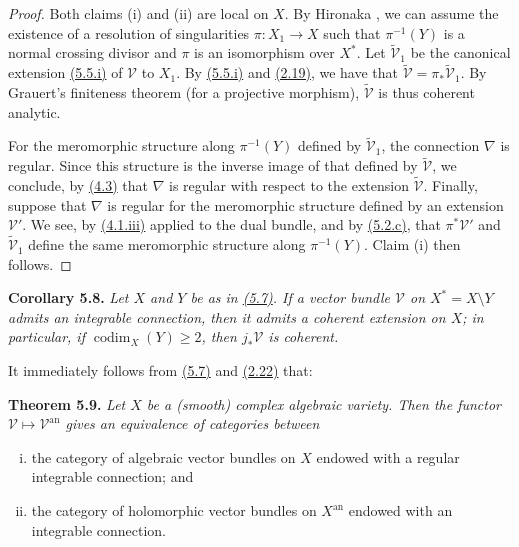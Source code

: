 \documentclass{report}
\newenvironment{itenv}[1]
  {\phantomsection\par\medskip\noindent\textbf{#1.}\itshape}
  {\par\medskip}
\renewcommand{\cal}[1]{{\mathcal{#1}}}
\newcommand{\an}{\mathrm{an}}
\renewcommand{\geq}{\geqslant}
\DeclareMathOperator{\codim}{codim}
\newcommand{\oldpage}[1]{\marginpar{\footnotesize$\Big\vert$ \textit{p.~#1}}}
\begin{document}
\begin{proof}
  Both claims (i) and (ii) are local on $X$.
  By Hironaka \cite{12}, we can assume the existence of a resolution of singularities $\pi\colon X_1\to X$ such that $\pi^{-1}(Y)$ is a normal crossing divisor and $\pi$ is an isomorphism over $X^*$.
  Let $\widetilde{\cal{V}}_1$ be the canonical extension \hyperref[II.5.5]{(5.5.i)} of $\cal{V}$ to $X_1$.
\oldpage{97}
  By \hyperref[II.5.5]{(5.5.i)} and \hyperref[II.2.19]{(2.19)}, we have that $\widetilde{\cal{V}}=\pi_*\widetilde{\cal{V}}_1$.
  By Grauert's finiteness theorem (for a projective morphism), $\widetilde{\cal{V}}$ is thus coherent analytic.

  For the meromorphic structure along $\pi^{-1}(Y)$ defined by $\widetilde{\cal{V}}_1$, the connection $\nabla$ is regular.
  Since this structure is the inverse image of that defined by $\widetilde{\cal{V}}$, we conclude, by \hyperref[II.4.3]{(4.3)} that $\nabla$ is regular with respect to the extension $\widetilde{\cal{V}}$.
  Finally, suppose that $\nabla$ is regular for the meromorphic structure defined by an extension $\cal{V}'$.
  We see, by \hyperref[II.4.1]{(4.1.iii)} applied to the dual bundle, and by \hyperref[II.5.2]{(5.2.c)}, that $\pi^*\cal{V}'$ and $\widetilde{\cal{V}}_1$ define the same meromorphic structure along $\pi^{-1}(Y)$.
  Claim (i) then follows.
\end{proof}

\begin{itenv}{Corollary 5.8}
\label{II.5.8}
  Let $X$ and $Y$ be as in \hyperref[II.5.7]{(5.7)}.
  If a vector bundle $\cal{V}$ on $X^*=X\setminus Y$ admits an integrable connection, then it admits a coherent extension on $X$;
  in particular, if $\codim_X(Y)\geq2$, then $j_*\cal{V}$ is coherent.
\end{itenv}

It immediately follows from \hyperref[II.5.7]{(5.7)} and \hyperref[II.2.22]{(2.22)} that:

\begin{itenv}{Theorem 5.9}
\label{II.5.9}
  Let $X$ be a (smooth) complex algebraic variety.
  Then the functor $\cal{V}\mapsto\cal{V}^\an$ gives an equivalence of categories between
  \begin{enumerate}[(i)]
    \item the category of algebraic vector bundles on $X$ endowed with a regular integrable connection; and
    \item the category of holomorphic vector bundles on $X^\an$ endowed with an integrable connection.
  \end{enumerate}
\end{itenv}
\end{document}
